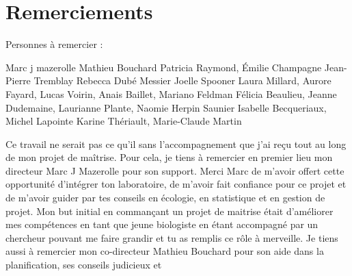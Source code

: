 \chapter*{Remerciements}        %
\label{chap-remerciements}      %

Personnes à remercier :

 Marc j mazerolle
 Mathieu Bouchard
 Patricia Raymond, Émilie Champagne
 Jean-Pierre Tremblay
 Rebecca Dubé Messier
 Joelle Spooner 
 Laura Millard, Aurore Fayard, Lucas Voirin, Anais Baillet, Mariano Feldman
 Félicia Beaulieu, Jeanne Dudemaine, Laurianne Plante, Naomie Herpin Saunier
 Isabelle Becqueriaux, Michel Lapointe
 Karine Thériault, Marie-Claude Martin

 Ce travail ne serait pas ce qu'il sans l'accompagnement que j'ai reçu tout au long de mon projet de maîtrise.
 Pour cela, je tiens à remercier en premier lieu mon directeur Marc J Mazerolle pour son support. Merci Marc de m'avoir offert cette opportunité d'intégrer ton laboratoire, 
 de m'avoir fait confiance pour ce projet et de m'avoir guider par tes conseils en écologie, en statistique et en gestion de projet. 
 Mon but initial en commançant un projet de maitrise était d'améliorer mes compétences en tant que jeune biologiste en étant accompagné par un chercheur pouvant me faire grandir et tu as remplis ce rôle à merveille. 
 Je tiens aussi à remercier mon co-directeur Mathieu Bouchard pour son aide dans la planification, ses conseils judicieux et 